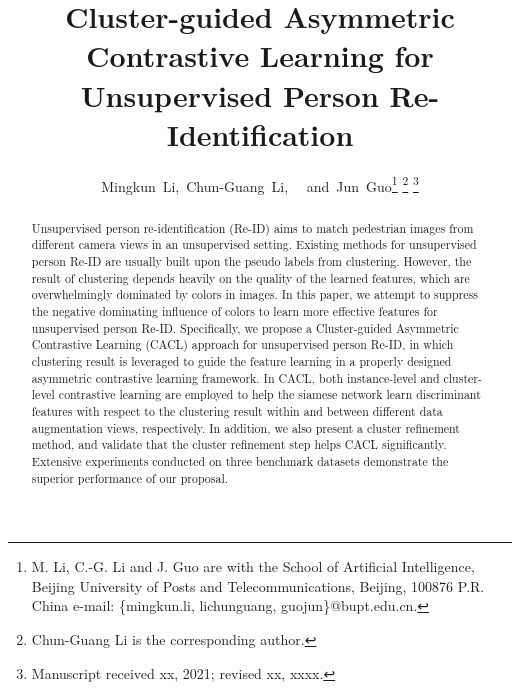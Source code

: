 \documentclass[journal]{IEEEtran}
\begin{document}
\title{{Cluster-guided Asymmetric Contrastive Learning for Unsupervised Person Re-Identification}}








\author{Mingkun~Li,~Chun-Guang~Li,~  
        ~and~Jun~Guo\thanks{M. Li, C.-G. Li and J. Guo are with the School of Artificial Intelligence,  Beijing University of Posts and Telecommunications, Beijing, 100876 P.R. China e-mail: \{mingkun.li, lichunguang, guojun\}@bupt.edu.cn.}
        \thanks{Chun-Guang Li is the corresponding author.}
\thanks{Manuscript received xx, 2021; revised xx, xxxx.}
}












\maketitle

\begin{abstract}
Unsupervised person re-identification (Re-ID) aims to match pedestrian images from different camera views in an unsupervised setting. 
Existing methods for unsupervised person Re-ID are usually built upon the pseudo labels from clustering. 
However, the result of clustering depends heavily on the quality of the learned features, which are overwhelmingly dominated by colors in images. In this paper, we attempt to suppress the negative dominating influence of colors to learn more effective features for unsupervised person Re-ID. 
Specifically, we propose a Cluster-guided Asymmetric Contrastive Learning (CACL) approach for unsupervised person Re-ID, in which clustering result is leveraged to guide the feature learning in a properly designed asymmetric contrastive learning framework. In CACL, both instance-level and cluster-level contrastive learning are employed to help the siamese network learn discriminant features with respect to the clustering result within and between different data augmentation views, respectively.
In addition, we also present a cluster refinement method, and validate that the cluster refinement step helps CACL significantly. 
Extensive experiments conducted on three benchmark datasets demonstrate the superior performance of our proposal. 
\end{abstract}
\end{document}
